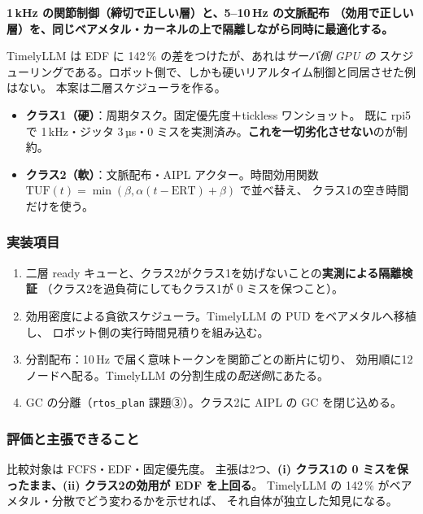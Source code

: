 \documentclass[11pt,a4paper]{article}
\newcommand{\code}[1]{\texttt{#1}}
\newcommand{\keyp}[1]{\textbf{\textcolor{blue!45!black}{#1}}}
\begin{document}
\keyp{1\,kHz の関節制御（締切で正しい層）と、5--10\,Hz の文脈配布
（効用で正しい層）を、同じベアメタル・カーネルの上で隔離しながら同時に最適化する。}

TimelyLLM は EDF に 142\,\% の差をつけたが、あれは\emph{サーバ側 GPU の}
スケジューリングである。ロボット側で、しかも硬いリアルタイム制御と同居させた例はない。
本案は二層スケジューラを作る。

\begin{itemize}[leftmargin=1.4em,itemsep=2pt]
  \item \textbf{クラス1（硬）}：周期タスク。固定優先度＋tickless ワンショット。
        既に rpi5 で 1\,kHz・ジッタ 3\,µs・0 ミスを実測済み。\keyp{これを一切劣化させない}のが制約。
  \item \textbf{クラス2（軟）}：文脈配布・AIPL アクター。時間効用関数
        $\mathrm{TUF}(t)=\min(\beta,\alpha(t-\mathrm{ERT})+\beta)$ で並べ替え、
        クラス1の空き時間だけを使う。
\end{itemize}

\subsubsection*{実装項目}

\begin{enumerate}[leftmargin=1.6em,itemsep=2pt]
  \item 二層 ready キューと、クラス2がクラス1を妨げないことの\keyp{実測による隔離検証}
        （クラス2を過負荷にしてもクラス1が 0 ミスを保つこと）。
  \item 効用密度による貪欲スケジューラ。TimelyLLM の PUD をベアメタルへ移植し、
        ロボット側の実行時間見積りを組み込む。
  \item 分割配布：10\,Hz で届く意味トークンを関節ごとの断片に切り、
        効用順に12ノードへ配る。TimelyLLM の分割生成の\emph{配送側}にあたる。
  \item GC の分離（\code{rtos\_plan} 課題③）。クラス2に AIPL の GC を閉じ込める。
\end{enumerate}

\subsubsection*{評価と主張できること}

比較対象は FCFS・EDF・固定優先度。
主張は2つ、\keyp{(i) クラス1の 0 ミスを保ったまま、(ii) クラス2の効用が EDF を上回る}。
TimelyLLM の 142\,\% がベアメタル・分散でどう変わるかを示せれば、
それ自体が独立した知見になる。
\end{document}
